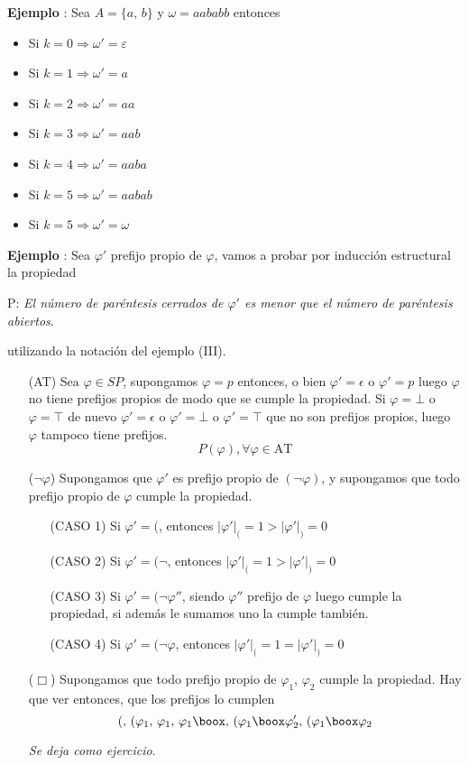 \addtocounter{ej}{1} %
\textbf{Ejemplo }: Sea $A=\{ a,\,b \}$ y $\omega=aababb$ entonces 
\begin{multicols}{2}
\begin{itemize}
	\item Si $k=0 \Rightarrow \omega'=\varepsilon$
	\item Si $k=1 \Rightarrow \omega'=a$
	\item Si $k=2 \Rightarrow \omega'=aa$
	\item Si $k=3 \Rightarrow \omega'=aab$
	\item Si $k=4 \Rightarrow \omega'=aaba$
	\item Si $k=5 \Rightarrow \omega'=aabab$
	\item Si $k=5 \Rightarrow \omega'=\omega$		
\end{itemize}
\end{multicols}
\addtocounter{ej}{1} %
\textbf{Ejemplo }: Sea $\varphi'$ prefijo propio de $\varphi$, vamos a probar por inducción estructural la propiedad 
\begin{center}
P: \textit{El número de paréntesis cerrados de $\varphi'$ es menor que el número de paréntesis abiertos}.
\end{center}
utilizando la notación del ejemplo (III).
\begin{itemize}
	\item[(AT)] Sea $\varphi \in SP$, supongamos $\varphi=p$ entonces, o bien $\varphi'=\epsilon$ o $\varphi'=p$ luego $\varphi$ no tiene prefijos propios de modo que se cumple la propiedad. Si $\varphi=\bot$ o $\varphi = \top$ de nuevo $\varphi'=\epsilon$ o $\varphi'=\bot$ o $\varphi'=\top$ que no son prefijos propios, luego $\varphi$ tampoco tiene prefijos. 
	\[ P(\varphi), \forall \varphi \in \mbox{AT} \]
	\item[($\lnot \varphi$)] Supongamos que $\varphi'$ es prefijo propio de $(\lnot \varphi)$, y supongamos que todo prefijo propio de $\varphi$ cumple la propiedad. 
	\begin{itemize}
		\item[(CASO 1)] Si $\varphi'=($, entonces $\vert \varphi' \vert_{(}=1 > \vert \varphi' \vert_{)}=0$
		\item[(CASO 2)] Si $\varphi'=(\lnot$, entonces $\vert \varphi' \vert_{(}=1 > \vert \varphi' \vert_{)}=0$
		\item[(CASO 3)] Si $\varphi'=(\lnot \varphi''$, siendo $\varphi''$ prefijo de $\varphi$ luego cumple la propiedad, si además le sumamos uno la cumple también. 
		\item[(CASO 4)] Si $\varphi'=(\lnot \varphi$, entonces $\vert \varphi' \vert_{(}=1 = \vert \varphi' \vert_{)}=0 $
\end{itemize}	 
 \item[($\Box$)] Supongamos que todo prefijo propio de $\varphi_1$,  $\varphi_2$ cumple la propiedad. Hay que ver entonces, que los prefijos lo cumplen 
 \[(, \, (\varphi_1, \, \varphi_1, \, \varphi_1 \boox, \, (\varphi_1 \boox \varphi_2', \, (\varphi_1 \boox \varphi_2  \]
 \begin{flushright}
 \textit{Se deja como ejercicio}.
 \end{flushright}
\end{itemize}
